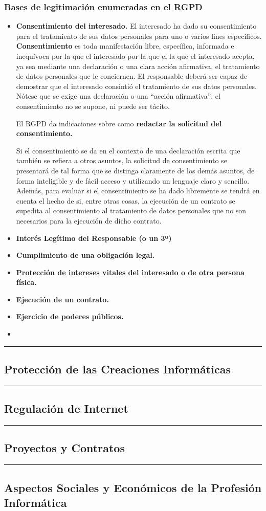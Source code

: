 \documentclass[spanish, 12pt, a4paper, twoside]{article}
\begin{document}
\subsubsection{Bases de legitimación enumeradas en el RGPD}

\begin{itemize}
    \item \textbf{Consentimiento del interesado.} El interesado ha dado su consentimiento para el tratamiento de sus datos personales para uno o varios fines específicos. \textbf{Consentimiento } es toda manifestación libre, específica, informada e inequívoca por la que el interesado por la que el la que el interesado acepta, ya sea mediante una declaración o una clara acción afirmativa, el tratamiento de datos personales que le conciernen. El responsable deberá ser capaz de demostrar que el interesado consintió el tratamiento de sus datos personales. Nótese que se exige una declaración o una “acción afirmativa”; el consentimiento no se supone, ni puede ser tácito.
    
    El RGPD da indicaciones sobre como \textbf{redactar la solicitud del consentimiento.}


    Si el consentimiento se da en el contexto de una declaración escrita que también se refiera a otros asuntos, 
    la solicitud de consentimiento se presentará de tal forma que se 
    distinga claramente de los demás asuntos, de forma inteligible y 
    de fácil acceso y utilizando un lenguaje claro y sencillo.
    Además, para evaluar si el consentimiento se ha dado libremente 
    se tendrá en cuenta el hecho de si, entre otras cosas, la ejecución
    de un contrato se supedita al consentimiento al tratamiento de datos
    personales que no son necesarios para la ejecución de dicho 
    contrato.
    \item \textbf{Interés Legítimo del Responsable (o un 3º)}
    \item \textbf{Cumplimiento de una obligación legal.}
    \item \textbf{Protección de intereses vitales del interesado o de otra persona física.}
    \item \textbf{Ejecución de un contrato.}
    \item \textbf{Ejercicio de poderes públicos.}
    \item 
\end{itemize}
\hfill \break
\newpage
\hrule
\subsection{Protección de las Creaciones Informáticas}

\newpage
\hrule
\subsection{Regulación de Internet}

\newpage
\hrule
\subsection{Proyectos y Contratos}

\newpage
\hrule
\subsection{Aspectos Sociales y Económicos de la Profesión Informática}
\end{document}
